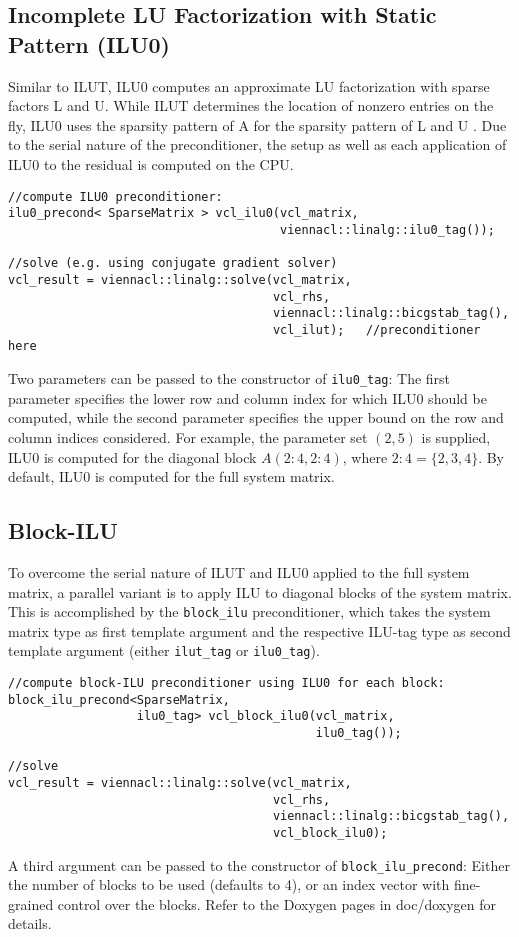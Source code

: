 \subsection{Incomplete LU Factorization with Static Pattern (ILU0)}
Similar to ILUT, ILU0 computes an approximate LU factorization with sparse factors L and U.
While ILUT determines the location of nonzero entries on the fly, ILU0 uses the sparsity pattern of A for the sparsity pattern of L and U \cite{saad-iterative-solution}.
Due to the serial nature of the preconditioner, the setup as well as each application of ILU0 to the residual is computed on
the CPU.

\begin{lstlisting}
//compute ILU0 preconditioner:
ilu0_precond< SparseMatrix > vcl_ilu0(vcl_matrix,
                                      viennacl::linalg::ilu0_tag());

//solve (e.g. using conjugate gradient solver)
vcl_result = viennacl::linalg::solve(vcl_matrix,
                                     vcl_rhs,
                                     viennacl::linalg::bicgstab_tag(),
                                     vcl_ilut);   //preconditioner here
\end{lstlisting}
Two parameters can be passed to the constructor of \lstinline|ilu0_tag|:
The first parameter specifies the lower row and column index for which ILU0 should be computed, while the second parameter specifies the upper bound on the row and column indices considered.
For example, the parameter set $(2,5)$ is supplied, ILU0 is computed for the diagonal block $A(2:4, 2:4)$, where $2:4 = \{2, 3, 4 \}$.
By default, ILU0 is computed for the full system matrix.

\subsection{Block-ILU}
To overcome the serial nature of ILUT and ILU0 applied to the full system matrix,
a parallel variant is to apply ILU to diagonal blocks of the system matrix.
This is accomplished by the \lstinline|block_ilu| preconditioner, which takes
the system matrix type as first template argument and the respective ILU-tag type as second template argument
(either \lstinline|ilut_tag| or \lstinline|ilu0_tag|). 

\begin{lstlisting}
//compute block-ILU preconditioner using ILU0 for each block:
block_ilu_precond<SparseMatrix,
                  ilu0_tag> vcl_block_ilu0(vcl_matrix,
                                           ilu0_tag());

//solve
vcl_result = viennacl::linalg::solve(vcl_matrix,
                                     vcl_rhs,
                                     viennacl::linalg::bicgstab_tag(),
                                     vcl_block_ilu0);
\end{lstlisting}
A third argument can be passed to the constructor of \lstinline|block_ilu_precond|: 
Either the number of blocks to be used (defaults to 4), or an index vector with fine-grained control over the blocks. Refer to the Doxygen pages in doc/doxygen for details.


